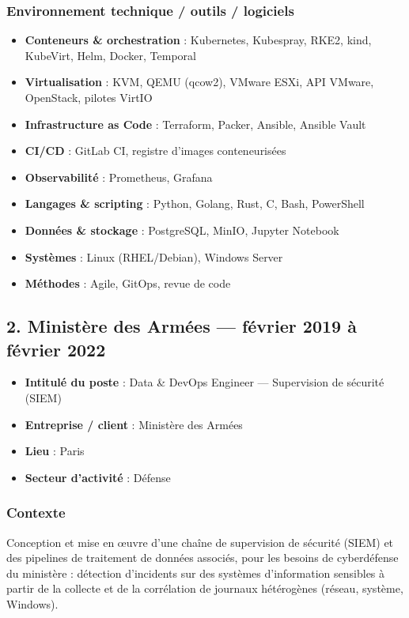 \documentclass[11pt,a4paper]{article}
\begin{document}
\subsubsection{Environnement technique / outils / logiciels}

\begin{itemize}
  \item \textbf{Conteneurs \& orchestration} : Kubernetes, Kubespray, RKE2, kind, KubeVirt, Helm, Docker, Temporal
  \item \textbf{Virtualisation} : KVM, QEMU (qcow2), VMware ESXi, API VMware, OpenStack, pilotes VirtIO
  \item \textbf{Infrastructure as Code} : Terraform, Packer, Ansible, Ansible Vault
  \item \textbf{CI/CD} : GitLab CI, registre d'images conteneurisées
  \item \textbf{Observabilité} : Prometheus, Grafana
  \item \textbf{Langages \& scripting} : Python, Golang, Rust, C, Bash, PowerShell
  \item \textbf{Données \& stockage} : PostgreSQL, MinIO, Jupyter Notebook
  \item \textbf{Systèmes} : Linux (RHEL/Debian), Windows Server
  \item \textbf{Méthodes} : Agile, GitOps, revue de code
\end{itemize}

\subsection{2. Ministère des Armées --- février 2019 à février 2022}

\begin{itemize}
  \item \textbf{Intitulé du poste} : Data \& DevOps Engineer --- Supervision de sécurité (SIEM)
  \item \textbf{Entreprise / client} : Ministère des Armées
  \item \textbf{Lieu} : Paris
  \item \textbf{Secteur d'activité} : Défense
\end{itemize}

\subsubsection{Contexte}

Conception et mise en œuvre d'une chaîne de supervision de sécurité (SIEM) et des pipelines de traitement de données associés, pour les besoins de cyberdéfense du ministère : détection d'incidents sur des systèmes d'information sensibles à partir de la collecte et de la corrélation de journaux hétérogènes (réseau, système, Windows).
\end{document}

